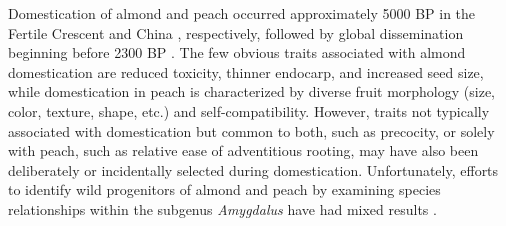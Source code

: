 \documentclass[12pt]{article}
\begin{document}
Domestication of almond and peach occurred approximately 5000 BP in the Fertile Crescent and China \citep{zohary2012domestication}, respectively, followed by global dissemination beginning before 2300 BP \citep{hedrick1917peaches, edwards1975almond, gradziel2011origin, zheng2014archaeological}. 
%
%
%
%
The few obvious traits associated with almond domestication are reduced toxicity, thinner endocarp, and increased seed size, while domestication in peach is characterized by diverse fruit morphology (size, color, texture, shape, etc.) and self-compatibility.
%
However, traits not typically associated with domestication but common to both, such as precocity, or solely with peach, such as relative ease of adventitious rooting, may have also been deliberately or incidentally selected during domestication. 
%
Unfortunately, efforts to identify wild progenitors of almond and peach by examining species relationships within the subgenus \emph{Amygdalus} have had mixed results \citep{verde2013high, aradhya2004molecular, zeinalabedini2010origin, mowrey1990isozyme, browicz1996genus, ladizinsky1999origin, bassi20081}. 
\end{document}
